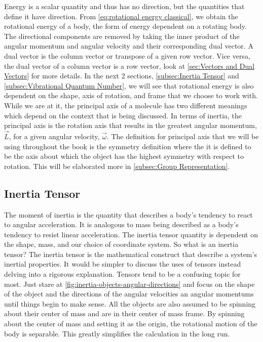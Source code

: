 \documentclass[11pt,a4paper]{book}
\begin{document}
			Energy is a scalar quantity and thus has no direction, but the quantities that define it have direction. From \autoref{eq:rotational energy classical}, we obtain the rotational energy of a body, the form of energy dependent on a rotating body. The directional components are removed by taking the inner product of the angular momentum and angular velocity and their corresponding dual vector. A dual vector is the column vector or transpose of a given row vector. Vice versa, the dual vector of a column vector is a row vector, look at \autoref{sec:Vectors and Dual Vectors} for more details. In the next 2 sections, \autoref{subsec:Inertia Tensor} and \autoref{subsec:Vibrational Quantum Number}, we will see that rotational energy is also dependent on the shape, axis of rotation, and frame that we choose to work with. While we are at it, the principal axis of a molecule has two different meanings which depend on the context that is being discussed. In terms of inertia, the principal axis is the rotation axis that results in the greatest angular momentum, $\vec{L}$, for a given angular velocity, $\vec{\omega}$. The definition for principal axis that we will be using throughout the book is the symmetry definition where the it is defined to be the axis about which the object has the highest symmetry with respect to rotation. This will be elaborated more in \autoref{subsec:Group Representation}.
			
		\subsection{Inertia Tensor}
			\label{subsec:Inertia Tensor}
			The moment of inertia is the quantity that describes a body's tendency to react to angular acceleration. It is analogous to mass being described as a body's tendency to resist linear acceleration. The inertia tensor quantity is dependent on the shape, mass, and our choice of coordinate system. So what is an inertia tensor? The inertia tensor is the mathematical construct that describe a system's inertial properties. It would be simpler to discuss the uses of tensors instead delving into a rigorous explanation. Tensors tend to be a confusing topic for most. Just stare at \autoref{fig:inertia-objects-angular-directions} and focus on the shape of the object and the directions of the angular velocities an angular momentums until things begin to make sense. All the objects are also assumed to be spinning about their center of mass and are in their center of mass frame. By spinning about the center of mass and setting it as the origin, the rotational motion of the body is separable. This greatly simplifies the calculation in the long run.
			
\end{document}
